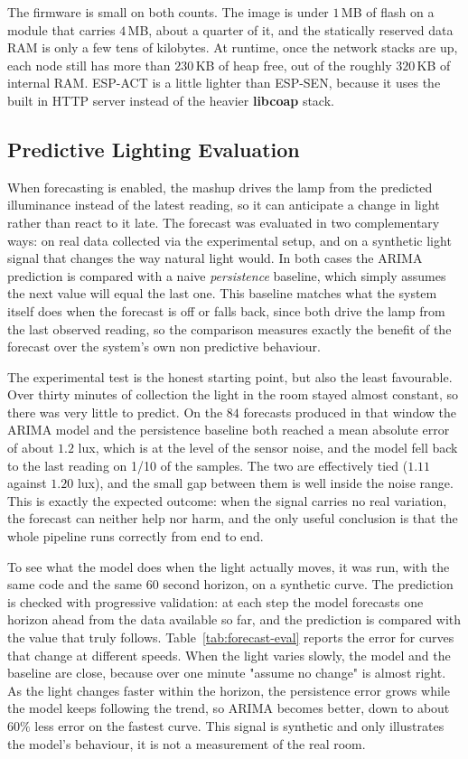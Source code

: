 \documentclass[conference]{IEEEtran}
\begin{document}
The firmware is small on both counts. The image is under $1$\,MB of flash on a module that carries $4$\,MB, about a quarter of it, and the statically reserved data RAM is only a few tens of kilobytes. At runtime, once the network stacks are up, each node still has more than $230$\,KB of heap free, out of the roughly $320$\,KB of internal RAM. ESP-ACT is a little lighter than ESP-SEN, because it uses the built in HTTP server instead of the heavier \textbf{libcoap} stack.

\subsection{Predictive Lighting Evaluation}
\label{sec:forecast}
When forecasting is enabled, the mashup drives the lamp from the predicted illuminance instead of the latest reading, so it can anticipate a change in light rather than react to it late. The forecast was evaluated in two complementary ways: on real data collected via the experimental setup, and on a synthetic light signal that changes the way natural light would. In both cases the ARIMA prediction is compared with a naive \emph{persistence} baseline, which simply assumes the next value will equal the last one. This baseline matches what the system itself does when the forecast is off or falls back, since both drive the lamp from the last observed reading, so the comparison measures exactly the benefit of the forecast over the system's own non predictive behaviour.

The experimental test is the honest starting point, but also the least favourable. Over thirty minutes of collection the light in the room stayed almost constant, so there was very little to predict. On the $84$ forecasts produced in that window the ARIMA model and the persistence baseline both reached a mean absolute error of about $1.2$ lux, which is at the level of the sensor noise, and the model fell back to the last reading on 1/10 of the samples. The two are effectively tied ($1.11$ against $1.20$ lux), and the small gap between them is well inside the noise range. This is exactly the expected outcome: when the signal carries no real variation, the forecast can neither help nor harm, and the only useful conclusion is that the whole pipeline runs correctly from end to end.

To see what the model does when the light actually moves, it was run, with the same code and the same $60$ second horizon, on a synthetic curve. The prediction is checked with progressive validation: at each step the model forecasts one horizon ahead from the data available so far, and the prediction is compared with the value that truly follows. Table~\ref{tab:forecast-eval} reports the error for curves that change at different speeds. When the light varies slowly, the model and the baseline are close, because over one minute "assume no change" is almost right. As the light changes faster within the horizon, the persistence error grows while the model keeps following the trend, so ARIMA becomes better, down to about $60\%$ less error on the fastest curve. This signal is synthetic and only illustrates the model's behaviour, it is not a measurement of the real room.
\end{document}
